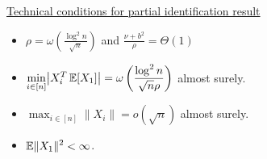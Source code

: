 \documentclass[aspectratio=169]{beamer}
\theoremstyle{remark}
\begin{document}
\begin{frame}
    \underline{Technical conditions for partial identification result} \\
    \vspace{6mm}
    \begin{itemize}
        \setlength{\itemsep}{1.75em}
        \item $\rho = \omega \left( \displaystyle \frac{ \log^2 n }{ \sqrt{n} } \right)$ and $\displaystyle \frac{ \nu + b^2 }{ \rho } = \Theta( 1 )$
        \item $\displaystyle \min_{i \in [n]} \abs*{X_i^T \, \E{X_1}} = \omega\left( \frac{ \log^2 n }{ \sqrt{ n } \rho } \right)$ almost surely.
        \item $\displaystyle \max_{i \in [n]} \| X_i \| = o(\sqrt{n})$ almost surely.
        \item $\displaystyle \mathbb{E} \| X_1 \|^2 < \infty$.
    \end{itemize}
\end{frame}



\end{document}
